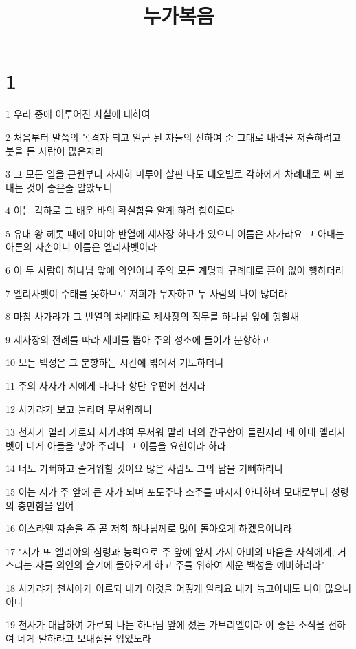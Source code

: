 

\title{누가복음}


\chapter{1}

\par 1 우리 중에 이루어진 사실에 대하여
\par 2 처음부터 말씀의 목격자 되고 일군 된 자들의 전하여 준 그대로 내력을 저술하려고 붓을 든 사람이 많은지라
\par 3 그 모든 일을 근원부터 자세히 미루어 살핀 나도 데오빌로 각하에게 차례대로 써 보내는 것이 좋은줄 알았노니
\par 4 이는 각하로 그 배운 바의 확실함을 알게 하려 함이로다
\par 5 유대 왕 헤롯 때에 아비야 반열에 제사장 하나가 있으니 이름은 사가랴요 그 아내는 아론의 자손이니 이름은 엘리사벳이라
\par 6 이 두 사람이 하나님 앞에 의인이니 주의 모든 계명과 규례대로 흠이 없이 행하더라
\par 7 엘리사벳이 수태를 못하므로 저희가 무자하고 두 사람의 나이 많더라
\par 8 마침 사가랴가 그 반열의 차례대로 제사장의 직무를 하나님 앞에 행할새
\par 9 제사장의 전례를 따라 제비를 뽑아 주의 성소에 들어가 분향하고
\par 10 모든 백성은 그 분향하는 시간에 밖에서 기도하더니
\par 11 주의 사자가 저에게 나타나 향단 우편에 선지라
\par 12 사가랴가 보고 놀라며 무서워하니
\par 13 천사가 일러 가로되 사가랴여 무서워 말라 너의 간구함이 들린지라 네 아내 엘리사벳이 네게 아들을 낳아 주리니 그 이름을 요한이라 하라
\par 14 너도 기뻐하고 즐거워할 것이요 많은 사람도 그의 남을 기뻐하리니
\par 15 이는 저가 주 앞에 큰 자가 되며 포도주나 소주를 마시지 아니하며 모태로부터 성령의 충만함을 입어
\par 16 이스라엘 자손을 주 곧 저희 하나님께로 많이 돌아오게 하겠음이니라
\par 17 "저가 또 엘리야의 심령과 능력으로 주 앞에 앞서 가서 아비의 마음을 자식에게, 거스리는 자를 의인의 슬기에 돌아오게 하고 주를 위하여 세운 백성을 예비하리라"
\par 18 사가랴가 천사에게 이르되 내가 이것을 어떻게 알리요 내가 늙고아내도 나이 많으니이다
\par 19 천사가 대답하여 가로되 나는 하나님 앞에 섰는 가브리엘이라 이 좋은 소식을 전하여 네게 말하라고 보내심을 입었노라
